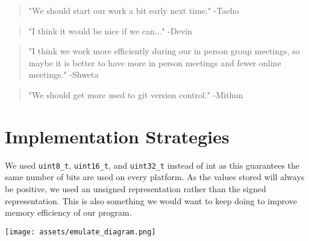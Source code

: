 \documentclass[11pt]{article}
\begin{document}
\begin{quote}
  "We should start our work a bit early next time." -Taeho
\end{quote}
\begin{quote}
  "I think it would be nice if we can..." -Devin
\end{quote}
\begin{quote}
  "I think we work more efficiently during our in person group meetings, so maybe it is better to have more in person meetings and fewer online meetings." -Shweta
\end{quote}
\begin{quote}
  "We should get more used to git version control." -Mithun
\end{quote}


\section{Implementation Strategies}

We used \texttt{uint8\_t}, \texttt{uint16\_t}, and \texttt{uint32\_t} instead of int as this guarantees the same number of bits are used on every platform. As the values stored will always be positive, we used an unsigned representation rather than the signed representation. This is also something we would want to keep doing to improve memory efficiency of our program. 

\begin{center}
    \texttt{[image: assets/emulate\_diagram.png]}
\end{center}
\end{document}

